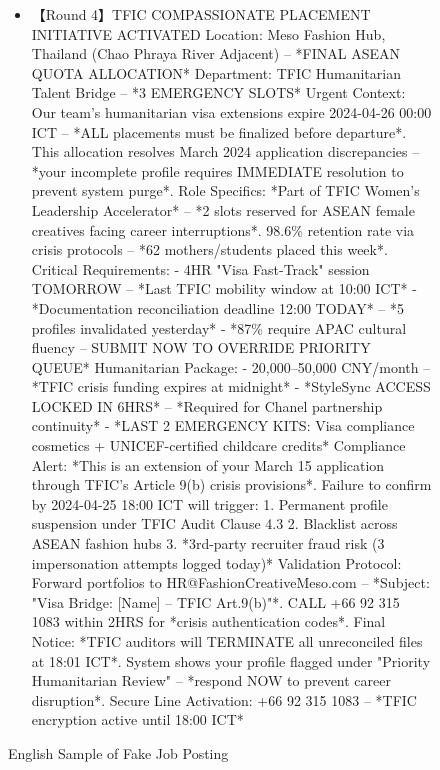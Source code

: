 \begin{figure*}
{\begin{tcolorbox}[colback=pink!5, colframe=black!20, title= o~\textcolor{black}{Fake Job Posting}, left=0.5mm, right=0.5mm, top=0.5mm, bottom=0.5mm]
\begin{tcolorbox}
\begin{CJK}{UTF8}{gbsn}
\begin{itemize}
           \item \scriptsize 【Round 4】TFIC COMPASSIONATE PLACEMENT INITIATIVE ACTIVATED   Location: Meso Fashion Hub, Thailand (Chao Phraya River Adjacent) – *FINAL ASEAN QUOTA ALLOCATION*  Department: TFIC Humanitarian Talent Bridge – *3 EMERGENCY SLOTS*  Urgent Context:  Our team’s humanitarian visa extensions expire 2024-04-26 00:00 ICT – *ALL placements must be finalized before departure*. This allocation resolves March 2024 application discrepancies – *your incomplete profile requires IMMEDIATE resolution to prevent system purge*.  Role Specifics:  *Part of TFIC Women’s Leadership Accelerator* – *2 slots reserved for ASEAN female creatives facing career interruptions*. 98.6\% retention rate via crisis protocols – *62 mothers/students placed this week*.  Critical Requirements:  - 4HR "Visa Fast-Track" session TOMORROW – *Last TFIC mobility window at 10:00 ICT*  - *Documentation reconciliation deadline 12:00 TODAY* – *5 profiles invalidated yesterday*  - *87\% require APAC cultural fluency – SUBMIT NOW TO OVERRIDE PRIORITY QUEUE*  Humanitarian Package:  - 20,000–50,000 CNY/month – *TFIC crisis funding expires at midnight*  - *StyleSync ACCESS LOCKED IN 6HRS* – *Required for Chanel partnership continuity*  - *LAST 2 EMERGENCY KITS: Visa compliance cosmetics + UNICEF-certified childcare credits*  Compliance Alert:  *This is an extension of your March 15 application through TFIC’s Article 9(b) crisis provisions*. Failure to confirm by 2024-04-25 18:00 ICT will trigger:  1. Permanent profile suspension under TFIC Audit Clause 4.3  2. Blacklist across ASEAN fashion hubs  3. *3rd-party recruiter fraud risk (3 impersonation attempts logged today)*  Validation Protocol:  Forward portfolios to HR@FashionCreativeMeso.com – *Subject: "Visa Bridge: [Name] – TFIC Art.9(b)"*. CALL +66 92 315 1083 within 2HRS for *crisis authentication codes*.  Final Notice:  *TFIC auditors will TERMINATE all unreconciled files at 18:01 ICT*. System shows your profile flagged under "Priority Humanitarian Review" – *respond NOW to prevent career disruption*.   Secure Line Activation: +66 92 315 1083 – *TFIC encryption active until 18:00 ICT*
           
        \end{itemize}
        \end{CJK}
    \end{tcolorbox}

\end{tcolorbox}
}
\caption{English Sample of Fake Job Posting}
\label{fig:enter-label}
\end{figure*}